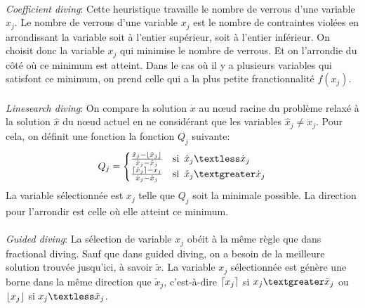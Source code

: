\documentclass[12pt,a4paper,oneside]{book}
\theoremstyle{definition}
\DeclarePairedDelimiter\ceil{\lceil}{\rceil}
\DeclarePairedDelimiter\floor{\lfloor}{\rfloor}
\begin{document}
	\paragraph{}
	\textit{Coefficient diving}: Cette heuristique travaille le nombre de verrous d'une variable $x_j$. Le nombre de verrous d'une variable $x_j$ est le nombre de contraintes violées en arrondissant la variable soit à l'entier supérieur, soit à l'entier inférieur. On choisit donc la variable $x_j$ qui minimise le nombre de verrous. Et on l'arrondie du côté où ce minimum est atteint. Dans le cas où il y a plusieurs variables qui satisfont ce minimum, on prend celle qui a la plus petite franctionnalité $f(x_j)$.

	\paragraph{}
	\textit{Linesearch diving}: On compare la solution $\dot{x}$ au nœud racine du problème relaxé à la solution $\hat{x}$ du nœud actuel en ne considérant que les variables $\hat{x}_j \neq \dot{x}_j$. Pour cela, on définit une fonction la fonction $Q_j$ suivante:
	\[
		Q_j = \begin{cases}
		\frac{\hat{x}_j - \floor{\hat{x}_j}}{\dot{x}_j - \hat{x}_j} & \text{si} \hspace{5pt} \hat{x}_j \textless \dot{x}_j \\
		\frac{\ceil{\hat{x}_j }- {x}_j}{\dot{x}_j - \hat{x}_j} & \text{si} \hspace{5pt} \hat{x}_j \textgreater \dot{x}_j \\ 
		\end{cases}
	\] 	
	La variable sélectionnée est $x_j$ telle que $Q_j$ soit la minimale possible. La direction pour l'arrondir est celle où elle atteint ce minimum.

	\paragraph{}
	\textit{Guided diving}: La sélection de variable $x_j$ obéit à la même règle que dans fractional diving. Sauf que dans guided diving, on a besoin de la meilleure solution trouvée jusqu'ici, à savoir $\tilde{x}$. La variable $x_j$ sélectionnée est génère une borne dans la même direction que $\tilde{x}_j$, c'est-à-dire $\ceil{x_j}$ si $ x_j \textgreater \tilde{x}_j $ ou $\floor{x_j}$ si $ x_j \textless \tilde{x}_j $.
	
\end{document}
